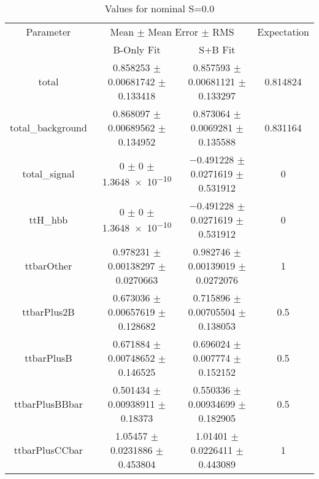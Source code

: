 \begin{table}
\centering
\caption{Values for nominal S=0.0}
\begin{tabular}{cccc}
\toprule
Parameter & \multicolumn{2}{c}{Mean $\pm$ Mean Error $\pm$ RMS} & Expectation\\
 & B-Only Fit & S+B Fit & \\
\midrule
total & \num{0.858253} $\pm$ \num{0.00681742} $\pm$ \num{0.133418} & \num{0.857593} $\pm$ \num{0.00681121} $\pm$ \num{0.133297} & \num{0.814824}\\
total\_background & \num{0.868097} $\pm$ \num{0.00689562} $\pm$ \num{0.134952} & \num{0.873064} $\pm$ \num{0.0069281} $\pm$ \num{0.135588} & \num{0.831164}\\
total\_signal & \num{0} $\pm$ \num{0} $\pm$ \num{1.3648e-10} & \num{-0.491228} $\pm$ \num{0.0271619} $\pm$ \num{0.531912} & \num{0}\\
ttH\_hbb & \num{0} $\pm$ \num{0} $\pm$ \num{1.3648e-10} & \num{-0.491228} $\pm$ \num{0.0271619} $\pm$ \num{0.531912} & \num{0}\\
ttbarOther & \num{0.978231} $\pm$ \num{0.00138297} $\pm$ \num{0.0270663} & \num{0.982746} $\pm$ \num{0.00139019} $\pm$ \num{0.0272076} & \num{1}\\
ttbarPlus2B & \num{0.673036} $\pm$ \num{0.00657619} $\pm$ \num{0.128682} & \num{0.715896} $\pm$ \num{0.00705504} $\pm$ \num{0.138053} & \num{0.5}\\
ttbarPlusB & \num{0.671884} $\pm$ \num{0.00748652} $\pm$ \num{0.146525} & \num{0.696024} $\pm$ \num{0.007774} $\pm$ \num{0.152152} & \num{0.5}\\
ttbarPlusBBbar & \num{0.501434} $\pm$ \num{0.00938911} $\pm$ \num{0.18373} & \num{0.550336} $\pm$ \num{0.00934699} $\pm$ \num{0.182905} & \num{0.5}\\
ttbarPlusCCbar & \num{1.05457} $\pm$ \num{0.0231886} $\pm$ \num{0.453804} & \num{1.01401} $\pm$ \num{0.0226411} $\pm$ \num{0.443089} & \num{1}\\
\bottomrule
\end{tabular}
\end{table}